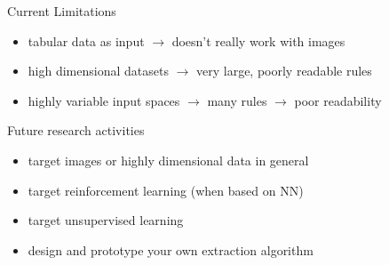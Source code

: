 \documentclass[presentation]{beamer}\mode<presentation>{\usetheme{AMSBolognaFC}}
\begin{document}
\begin{frame}{Current Limitations}
    \begin{itemize}
        \item tabular data as input $\rightarrow$ doesn't really work with images
        \item high dimensional datasets $\rightarrow$ very large, poorly readable rules
        \item highly variable input spaces $\rightarrow$ many rules $\rightarrow$ poor readability
    \end{itemize}
\end{frame}

\begin{frame}{Future research activities}
    \begin{itemize}
        \item target images or highly dimensional data in general
        \item target reinforcement learning (when based on NN)
        \item target unsupervised learning
        \item design and prototype your own extraction algorithm
    \end{itemize}
\end{frame}

\section*{}

\frame{\titlepage}

\section*{\refname}

\begin{frame}{\refname}
    \scriptsize
    
    
\end{frame}

\end{document}
